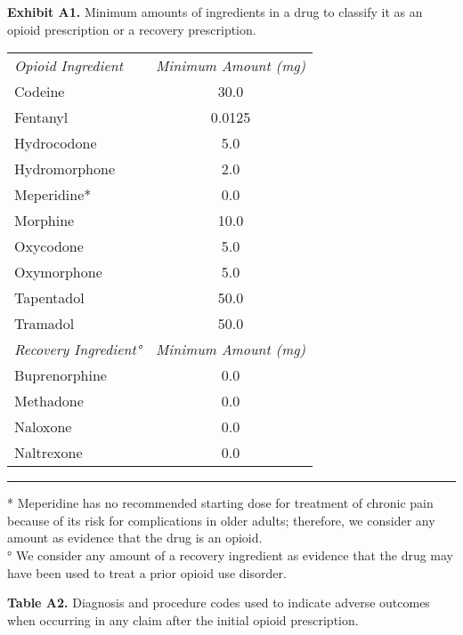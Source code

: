 \documentclass[11pt, letter]{article}
\begin{document}
\theendnotes

\newpage

\textbf{Exhibit A1.} Minimum amounts of ingredients in a drug to classify it as an opioid prescription or a recovery prescription.

\begin{tabular}{lc}
\em Opioid Ingredient & \em Minimum Amount (mg) \\[0.5em]
Codeine & 30.0 \\
Fentanyl & 0.0125 \\
Hydrocodone & 5.0 \\
Hydromorphone & 2.0 \\
Meperidine* & 0.0 \\
Morphine & 10.0 \\
Oxycodone & 5.0 \\
Oxymorphone & 5.0 \\
Tapentadol & 50.0 \\
Tramadol & 50.0 \\[1em]
\em Recovery Ingredient° & \em Minimum Amount (mg) \\[0.5em]
Buprenorphine & 0.0 \\
Methadone & 0.0 \\
Naloxone & 0.0 \\
Naltrexone & 0.0 \\[1em]
\end{tabular}

\hrule

\footnotesize
* Meperidine has no recommended starting dose for treatment of chronic pain because of its risk for complications in older adults; therefore, we consider any amount as evidence that the drug is an opioid. \\
° We consider any amount of a recovery ingredient as evidence that the drug may have been used to treat a prior opioid use disorder.
\normalsize

\newpage

\textbf{Table A2.} Diagnosis and procedure codes used to indicate adverse outcomes when occurring in any claim after the initial opioid prescription.
\end{document}
